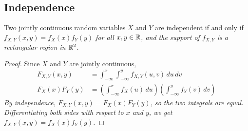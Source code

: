 %
%


\subsection{Independence}
\begin{lemma}
Two jointly continuous random variables $X$ and $Y$ are independent if and only if 
\ben
\it $f_{X,Y}(x,y) = f_X(x)f_Y(y)$ for all $x,y\in\mathbb{R}$, and
\it the support of $f_{X,Y}$ is a rectangular region in $\mathbb{R}^2$.
\een
\end{lemma}

\begin{proof}
Since $X$ and $Y$ are jointly continuous, 
\begin{align*}
F_{X,Y}(x,y)		& = \int_{-\infty}^x\int_{-\infty}^y f_{X,Y}(u,v)\,du\,dv \\
F_X(x)F_Y(y)		& = \left(\int_{-\infty}^x f_X(u)\,du\right)\left(\int_{-\infty}^y f_Y(v)\,dv\right)
\end{align*}
\bit
\it By independence, $F_{X,Y}(x,y)=F_X(x)F_Y(y)$, so the two integrals are equal.
\it Differentiating both sides with respect to $x$ and $y$, we get $f_{X,Y}(x,y)=f_X(x)f_Y(y)$.
\eit
\end{proof}

